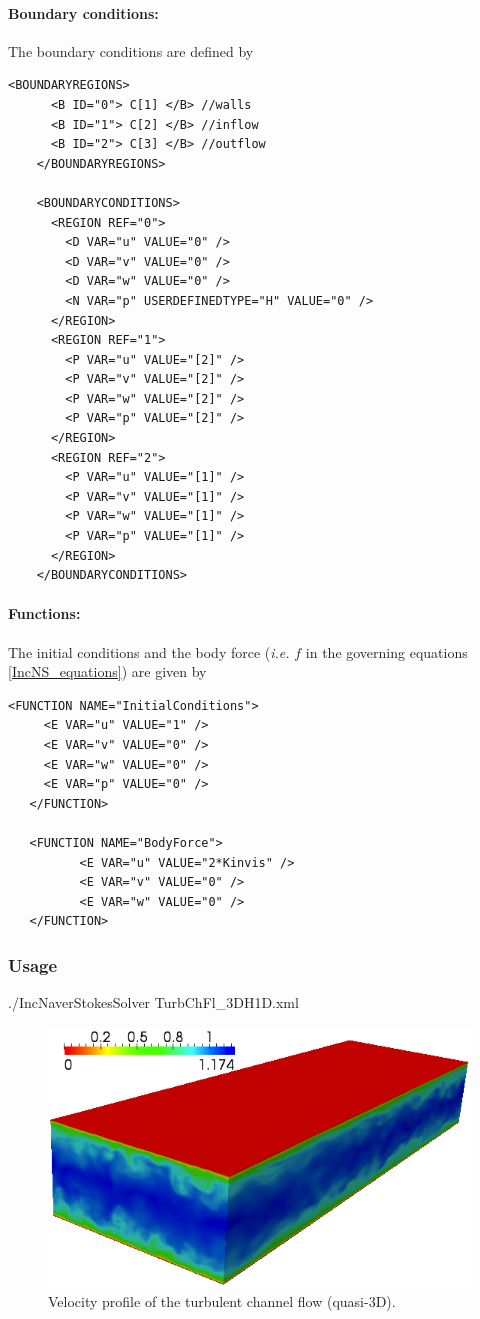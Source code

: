 \paragraph{Boundary conditions:~} The boundary conditions are defined by
\begin{lstlisting}[style=XMLStyle]
    <BOUNDARYREGIONS>
      <B ID="0"> C[1] </B> //walls
      <B ID="1"> C[2] </B> //inflow
      <B ID="2"> C[3] </B> //outflow
    </BOUNDARYREGIONS>

    <BOUNDARYCONDITIONS>
      <REGION REF="0">
        <D VAR="u" VALUE="0" />
        <D VAR="v" VALUE="0" />
        <D VAR="w" VALUE="0" />
        <N VAR="p" USERDEFINEDTYPE="H" VALUE="0" />  
      </REGION>
      <REGION REF="1">
        <P VAR="u" VALUE="[2]" />
        <P VAR="v" VALUE="[2]" />
        <P VAR="w" VALUE="[2]" />
        <P VAR="p" VALUE="[2]" />
      </REGION>
      <REGION REF="2">
        <P VAR="u" VALUE="[1]" />
        <P VAR="v" VALUE="[1]" />
        <P VAR="w" VALUE="[1]" />
        <P VAR="p" VALUE="[1]" />
      </REGION>
    </BOUNDARYCONDITIONS>
\end{lstlisting}

\paragraph{Functions:~} The initial conditions and the body force (\textit{i.e.} $f$ in the governing equations \ref{IncNS_equations}) are given by
\begin{lstlisting}[style=XMLStyle]
   <FUNCTION NAME="InitialConditions">
     <E VAR="u" VALUE="1" />
     <E VAR="v" VALUE="0" />
     <E VAR="w" VALUE="0" />
     <E VAR="p" VALUE="0" />
   </FUNCTION>
   
   <FUNCTION NAME="BodyForce">
          <E VAR="u" VALUE="2*Kinvis" />
          <E VAR="v" VALUE="0" />
          <E VAR="w" VALUE="0" />
   </FUNCTION>
\end{lstlisting}

\subsubsection{Usage} ./IncNaverStokesSolver TurbChFl\_3DH1D.xml 

\begin{figure}
\begin{center}
\includegraphics[width=12cm]{Figures/ChanCont.png}
\caption{Velocity profile of the turbulent channel flow (quasi-3D).}
\end{center}
\end{figure}


